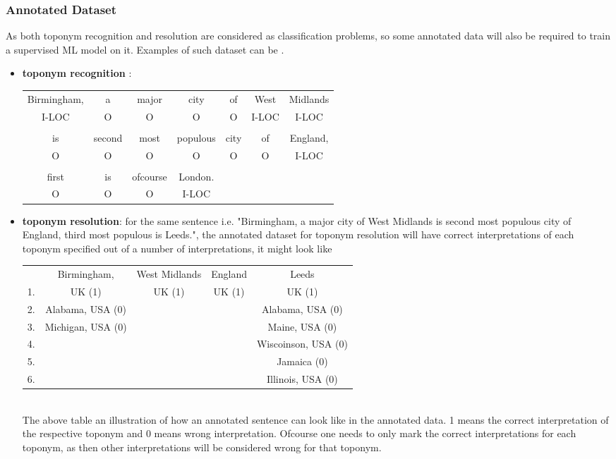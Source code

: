 \documentclass[
     11pt,         %
     a4paper,      %
     oneside,
     ]{article}
\begin{document}
\subsubsection{Annotated Dataset}
As both toponym recognition and resolution are considered as classification problems, so some annotated data will also be required to train a supervised ML model on  it. Examples of such dataset can be
.  \begin{itemize}[leftmargin=*]
	\item[] \textbf{toponym recognition }: \\
	{
	\selectfont
	\begin{tabular}{ c c c c c c c}
		
		Birmingham, & a & major & city & of & West & Midlands \\
		I-LOC & O & O & O & O & I-LOC & I-LOC \\
		{} \\
		is & second & most & populous & city & of & England,\\
		O & O & O & O & O & O & I-LOC \\
		{} \\
		first & is & ofcourse & London. \\
		O & O & O & I-LOC \\
	\end{tabular}
	}
	\item[] \textbf{toponym resolution}: for the same sentence i.e. "Birmingham, a major city of West Midlands is second most populous city of England, third most populous is Leeds.", the annotated dataset for toponym resolution will have correct interpretations of each toponym specified out of a number of interpretations, it might look like \\
	
	{
		\selectfont
		\begin{tabular}{ c| c | c | c | c }
			
			{} & Birmingham, &  West Midlands & England & Leeds\\
			1. & UK (1) & UK (1) & UK (1) & UK (1) \\
			2. & Alabama, USA (0)& {} & {} & Alabama, USA (0)\\
			3. & Michigan, USA (0)& {} & {} & Maine, USA (0)\\
			4. & {} & {} & {} & Wiscoinson, USA (0)\\
			5. & {} & {} & {} & Jamaica (0)\\
			6. & {} & {} & {} & Illinois, USA (0)\\
		\end{tabular}
	}
	{}\\
	The above table an illustration of how an annotated sentence can look like in the annotated data. 1 means the correct interpretation of the respective toponym and 0 means wrong interpretation. Ofcourse one needs to only mark the correct interpretations for each toponym, as then other interpretations will be considered wrong for that toponym. 
\end{itemize}
\end{document}
